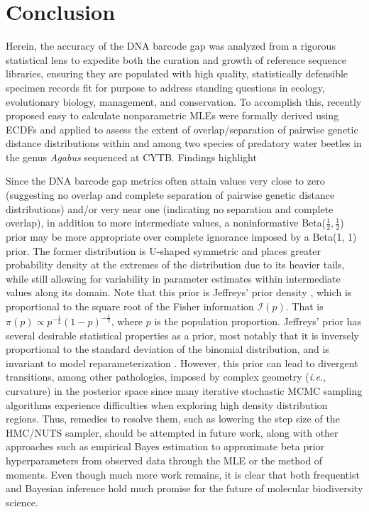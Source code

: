\documentclass[12pt]{article}
\begin{document}
\section{Conclusion}

Herein, the accuracy of the DNA barcode gap was analyzed from a rigorous statistical lens to expedite both the curation and growth of reference sequence libraries, ensuring they are populated with high quality, statistically defensible specimen records fit for purpose to address standing questions in ecology, evolutionary biology, management, and conservation. To accomplish this, recently proposed easy to calculate nonparametric MLEs were formally derived using ECDFs and applied to assess the extent of overlap/separation of pairwise genetic distance distributions within and among two species of predatory water beetles in the genus \textit{Agabus} sequenced at CYTB. Findings highlight 

Since the DNA barcode gap metrics often attain values very close to zero (suggesting no overlap and complete separation of pairwise genetic distance distributions) and/or very near one (indicating no separation and complete overlap), in addition to more intermediate values, a noninformative Beta($\frac{1}{2}, \frac{1}{2}$) prior may be more appropriate over complete ignorance imposed by a Beta(1, 1) prior. The former distribution is U-shaped symmetric and places greater probability density at the extremes of the distribution due to its heavier tails, while still allowing for variability in parameter estimates within intermediate values along its domain. Note that this prior is Jeffreys' prior density \citep{jeffreys1946invariant}, which is  proportional to the square root of the Fisher information $\mathcal{I}(p)$. That is
$\pi(p) \propto p^{-\frac{1}{2}}(1-p)^{-\frac{1}{2}}$, where $p$ is the population proportion. Jeffreys' prior has several desirable statistical  properties as a prior, most notably that it is inversely proportional to the standard deviation of the binomial distribution, and is invariant to model reparameterization \citep{gelman2014bayesian}. However, this prior can lead to divergent transitions, among other pathologies, imposed by complex geometry (\textit{i.e.}, curvature) in the posterior space since many iterative stochastic MCMC sampling algorithms experience difficulties when exploring high density distribution regions. Thus, remedies to resolve them, such as lowering the step size of the HMC/NUTS sampler, should be attempted in future work, along with other approaches such as empirical Bayes estimation to approximate beta prior hyperparameters from observed data through the MLE or the method of moments. Even though much more work remains, it is clear that both frequentist and Bayesian inference hold much promise for the future of molecular biodiversity science.
\end{document}
